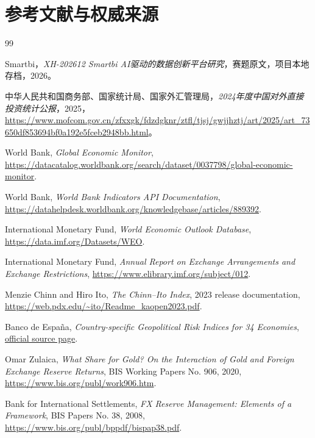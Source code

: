 \documentclass[UTF8,fontset=windows,12pt,openany]{ctexbook}
\begin{document}
\backmatter

\chapter*{参考文献与权威来源}

\begin{thebibliography}{99}

Smartbi，\emph{XH-202612 Smartbi AI驱动的数据创新平台研究}，赛题原文，项目本地存档，2026。

中华人民共和国商务部、国家统计局、国家外汇管理局，\emph{2024年度中国对外直接投资统计公报}，2025，\url{https://www.mofcom.gov.cn/zfxxgk/fdzdgknr/ztfl/tjsj/gwjjhztj/art/2025/art_73650df853694bf0a192e5fceb2948bb.html}。

World Bank, \emph{Global Economic Monitor}, \url{https://datacatalog.worldbank.org/search/dataset/0037798/global-economic-monitor}.

World Bank, \emph{World Bank Indicators API Documentation}, \url{https://datahelpdesk.worldbank.org/knowledgebase/articles/889392}.

International Monetary Fund, \emph{World Economic Outlook Database}, \url{https://data.imf.org/Datasets/WEO}.

International Monetary Fund, \emph{Annual Report on Exchange Arrangements and Exchange Restrictions}, \url{https://www.elibrary.imf.org/subject/012}.

Menzie Chinn and Hiro Ito, \emph{The Chinn--Ito Index}, 2023 release documentation, \url{https://web.pdx.edu/~ito/Readme_kaopen2023.pdf}.

Banco de España, \emph{Country-specific Geopolitical Risk Indices for 34 Economies}, \href{https://www.bde.es/wbe/en/areas-actuacion/analisis-e-investigacion/recursos/indices-de-riesgo-geopolitico-generales-y-bilaterales-para-34-economias-6075d2451c9da91.html}{official source page}.

Omar Zulaica, \emph{What Share for Gold? On the Interaction of Gold and Foreign Exchange Reserve Returns}, BIS Working Papers No. 906, 2020, \url{https://www.bis.org/publ/work906.htm}.

Bank for International Settlements, \emph{FX Reserve Management: Elements of a Framework}, BIS Papers No. 38, 2008, \url{https://www.bis.org/publ/bppdf/bispap38.pdf}.


\end{thebibliography}
\end{document}
